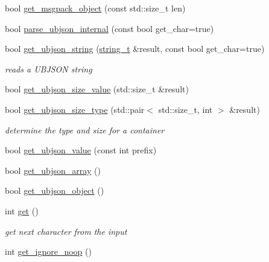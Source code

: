 \begin{DoxyCompactItemize}
\item 
bool \hyperlink{classnlohmann_1_1detail_1_1binary__reader_ad1190bb3499e243b0bbf795743a35563}{get\+\_\+msgpack\+\_\+object} (const std\+::size\+\_\+t len)
\item 
bool \hyperlink{classnlohmann_1_1detail_1_1binary__reader_af60c6bba6f1301cb02e0186c99e25751}{parse\+\_\+ubjson\+\_\+internal} (const bool get\+\_\+char=true)
\item 
bool \hyperlink{classnlohmann_1_1detail_1_1binary__reader_a2e01eab458020d18c975e8df55b20eca}{get\+\_\+ubjson\+\_\+string} (\hyperlink{classnlohmann_1_1detail_1_1binary__reader_aa0b9729917ca7ee6ed01e3792341316e}{string\+\_\+t} \&result, const bool get\+\_\+char=true)
\begin{DoxyCompactList}\small\item\em reads a U\+B\+J\+S\+ON string \end{DoxyCompactList}\item 
bool \hyperlink{classnlohmann_1_1detail_1_1binary__reader_a435be58e83c8491556d8f1a1b3439155}{get\+\_\+ubjson\+\_\+size\+\_\+value} (std\+::size\+\_\+t \&result)
\item 
bool \hyperlink{classnlohmann_1_1detail_1_1binary__reader_a4eae4604064b5dfe6d04e42ffc9e0753}{get\+\_\+ubjson\+\_\+size\+\_\+type} (std\+::pair$<$ std\+::size\+\_\+t, int $>$ \&result)
\begin{DoxyCompactList}\small\item\em determine the type and size for a container \end{DoxyCompactList}\item 
bool \hyperlink{classnlohmann_1_1detail_1_1binary__reader_a5f425199a77f403e32f076ff8487f853}{get\+\_\+ubjson\+\_\+value} (const int prefix)
\item 
bool \hyperlink{classnlohmann_1_1detail_1_1binary__reader_a4e8ef9561d4403ea68e3c2712fd289e2}{get\+\_\+ubjson\+\_\+array} ()
\item 
bool \hyperlink{classnlohmann_1_1detail_1_1binary__reader_ad0932dd568fcbbd2b4c2ccf9122544a5}{get\+\_\+ubjson\+\_\+object} ()
\item 
int \hyperlink{classnlohmann_1_1detail_1_1binary__reader_af70e7d5f19a2ee196e24f58acf579411}{get} ()
\begin{DoxyCompactList}\small\item\em get next character from the input \end{DoxyCompactList}\item 
int \hyperlink{classnlohmann_1_1detail_1_1binary__reader_a11a145292c1cc44656c34a6aef38759c}{get\+\_\+ignore\+\_\+noop} ()

\end{DoxyCompactItemize}
